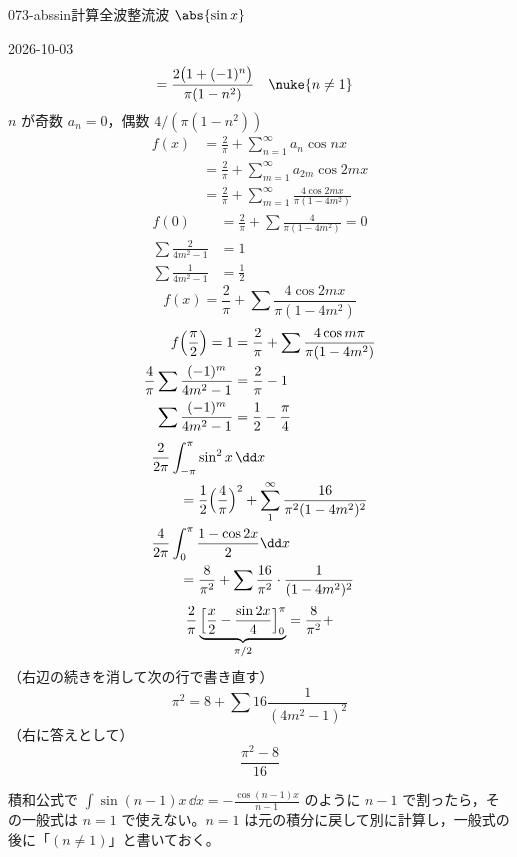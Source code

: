 \documentclass[uplatex,dvipdfmx,a4paper,11pt]{jsarticle}
\begin{document}
\begin{mondai}{073-abssin}{計算}{全波整流波 $\abs{\sin x}$}
\begin{kotaeutsushi}{2026-10-03}
\begin{align*}
  &=\frac{2\bigl(1+(-1)^{n}\bigr)}{\pi(1-n^{2})}\quad\nuke{n\neq1}
\end{align*}
$n$ が奇数 $a_n=0$，偶数 $4/(\pi(1-n^{2}))$
\begin{align*}
  f(x)&=\frac{2}{\pi}+\sum_{n=1}^{\infty}a_n\cos nx\\
  &=\frac{2}{\pi}+\sum_{m=1}^{\infty}a_{2m}\cos2mx\\
  &=\frac{2}{\pi}+\sum_{m=1}^{\infty}\frac{4\cos2mx}{\pi(1-4m^{2})}
\end{align*}
\begin{align*}
  f(0)&=\frac{2}{\pi}+\sum\frac{4}{\pi(1-4m^{2})}=0\\
  \sum\frac{2}{4m^{2}-1}&=1\\
  \sum\frac{1}{4m^{2}-1}&=\frac{1}{2}
\end{align*}
\[ f(x)=\frac{2}{\pi}+\sum\frac{4\cos2mx}{\pi(1-4m^{2})} \]
\begin{align*}
  f\Bigl(\frac{\pi}{2}\Bigr)=1&=\frac{2}{\pi}+\sum\frac{4\cos m\pi}{\pi(1-4m^{2})}\\
  \frac{4}{\pi}\sum\frac{(-1)^{m}}{4m^{2}-1}&=\frac{2}{\pi}-1\\
  \sum\frac{(-1)^{m}}{4m^{2}-1}&=\frac{1}{2}-\frac{\pi}{4}
\end{align*}
\begin{align*}
  &\frac{2}{2\pi}\int_{-\pi}^{\pi}\sin^{2}x\,\dd x\\
  &\qquad=\frac{1}{2}\Bigl(\frac{4}{\pi}\Bigr)^{2}+\sum_{1}^{\infty}\frac{16}{\pi^{2}(1-4m^{2})^{2}}\\
  &\frac{4}{2\pi}\int_{0}^{\pi}\frac{1-\cos2x}{2}\dd x\\
  &\qquad=\frac{8}{\pi^{2}}+\sum\frac{16}{\pi^{2}}\cdot\frac{1}{(1-4m^{2})^{2}}
\end{align*}
\[ \frac{2}{\pi}\underbrace{\Bigl[\frac{x}{2}-\frac{\sin2x}{4}\Bigr]_{0}^{\pi}}_{\pi/2}=\frac{8}{\pi^{2}}+ \]
（右辺の続きを消して次の行で書き直す）
\[ \pi^{2}=8+\sum16\frac{1}{(4m^{2}-1)^{2}} \]
（右に答えとして）
\[ \frac{\pi^{2}-8}{16} \]
\end{kotaeutsushi}
\begin{kizuki}
\item 積和公式で $\int\sin(n-1)x\,\dd x=-\frac{\cos(n-1)x}{n-1}$ のように $n-1$ で割ったら，その一般式は $n=1$ で使えない。$n=1$ は元の積分に戻して別に計算し，一般式の後に「$(n\neq1)$」と書いておく。

\end{kizuki}
\end{mondai}
\end{document}

